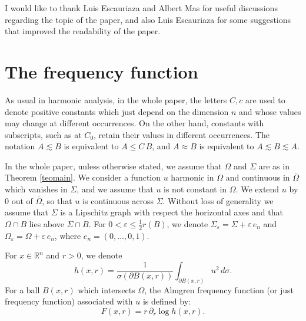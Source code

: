 \documentclass[11pt]{amsart}
\newcommand{\R}{{\mathbb R}}       %
\newcommand{\ve}{{\varepsilon}}
\newcommand{\vv}{{\vspace{2mm}}}
\theoremstyle{definition}
\theoremstyle{remark}
\numberwithin{equation}{section}
\begin{document}
\vv

I would like to thank Luis Escauriaza and Albert Mas for useful discussions regarding the topic of the paper, and also Luis Escauriaza for
some suggestions that improved the readability of the paper.

\vv


\section{The frequency function}

As usual in harmonic analysis, in the whole paper, the letters $C,c$ are used to denote positive constants
which just depend on the dimension $n$ and whose values may change at different occurrences.
On the other hand, constants with subscripts, such as at $C_0$, retain their values in different occurrences. The notation $A\lesssim B$ is equivalent to $A\leq C \,B$, and $A\approx B$ is
equivalent to $A\lesssim B\lesssim A$.
\vv

In the whole paper, unless otherwise stated, we assume that $\Omega$ and $\Sigma$ are as in 
Theorem \ref{teomain}. 
We consider a function $u$ harmonic in $\Omega$ and continuous in $\overline \Omega$ which vanishes in $\Sigma$, and we assume that $u$ is not constant in $\Omega$. 
We extend $u$ by $0$
out of $\overline\Omega$, so that $u$ is continuous across $\Sigma$. 
Without loss of generality we assume that $\Sigma$ is a Lipschitz graph with respect the horizontal axes and that $\Omega\cap B$ lies above $\Sigma\cap B$. For $0<\ve\leq \frac12r(B)$, we denote $\Sigma_\ve = \Sigma + \ve\,e_n$
and $\Omega_\ve = \Omega + \ve\,e_n$,
where $e_n=(0,\ldots,0,1)$. 

For $x\in\R^n$ and $r>0$, we denote
$$h(x,r) = \frac1{\sigma(\partial B(x,r))} \int_{\partial B(x,r)} u^2\,d\sigma.$$
For a ball $B(x,r)$ which intersects $\Omega$, the Almgren frequency function (or just frequency function) associated with $u$ is defined by:
$$F(x,r) = 
r\,\partial_r \log h(x,r).$$
\end{document}
